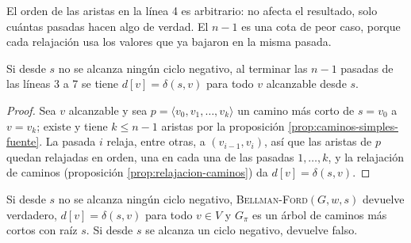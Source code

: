 \documentclass[11pt,letterpaper]{article}
\begin{document}
El orden de las aristas en la línea 4 es arbitrario: no afecta el
resultado, solo cuántas pasadas hacen algo de verdad. El $n - 1$ es
una cota de peor caso, porque cada relajación usa los valores que ya
bajaron en la misma pasada.

\begin{lema}\label{lem:bellman-ford-pasadas}
  Si desde $s$ no se alcanza ningún ciclo negativo, al terminar las
  $n - 1$ pasadas de las líneas 3 a 7 se tiene $d[v] = \delta(s, v)$
  para todo $v$ alcanzable desde $s$.
\end{lema}

\begin{proof}
  Sea $v$ alcanzable y sea $p = \langle v_0, v_1, \dots, v_k\rangle$
  un camino más corto de $s = v_0$ a $v = v_k$; existe y tiene
  $k \le n - 1$ aristas por la proposición
  \ref{prop:caminos-simples-fuente}. La pasada $i$ relaja, entre
  otras, a $(v_{i-1}, v_i)$, así que las aristas de $p$ quedan
  relajadas en orden, una en cada una de las pasadas $1, \dots, k$, y
  la relajación de caminos (proposición
  \ref{prop:relajacion-caminos}) da $d[v] = \delta(s, v)$.
\end{proof}

\begin{teorema}
  \label{teo:bellman-ford-correccion}
  Si desde $s$ no se alcanza ningún ciclo negativo,
  \textsc{Bellman-Ford}$(G, w, s)$ devuelve verdadero,
  $d[v] = \delta(s, v)$ para todo $v \in V$ y $G_\pi$ es un árbol de
  caminos más cortos con raíz $s$. Si desde $s$ se alcanza un ciclo
  negativo, devuelve falso.
\end{teorema}
\end{document}
